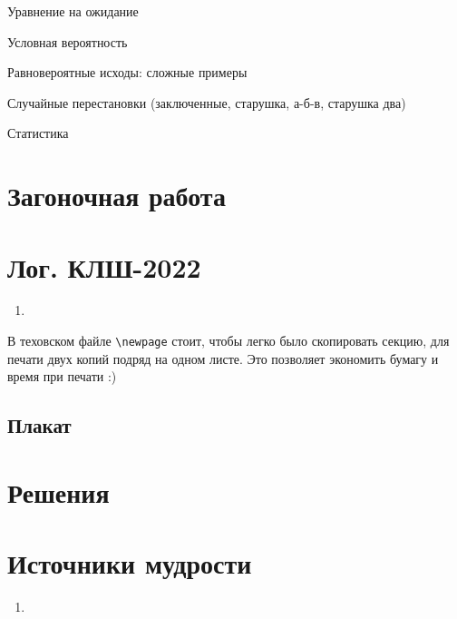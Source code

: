 \documentclass[12pt]{article}
\newcounter{problem}[section]
\theoremstyle{definition}
\begin{document}
Уравнение на ожидание

Условная вероятность

Равновероятные исходы: сложные примеры

Случайные перестановки (заключенные, старушка, а-б-в, старушка два)

Статистика




\section{Загоночная работа}





\newpage

\section{Лог. КЛШ-2022}

\begin{enumerate}
  \item 
\end{enumerate}

В теховском файле \verb|\newpage| стоит, чтобы легко было скопировать секцию, для печати двух копий подряд на одном листе.
Это позволяет экономить бумагу и время при печати :)

\subsection{Плакат}






\renewenvironment{solution}[1]{%
         \vskip .5cm plus 2cm minus 0.1cm%
         {\bfseries \hyperlink{problem:#1}{#1.}}%
}%
{%
}%



\section{Решения}



\section{Источники мудрости}


\begin{enumerate}
\item 
\end{enumerate}

\printbibliography[heading=none]
\end{document}
